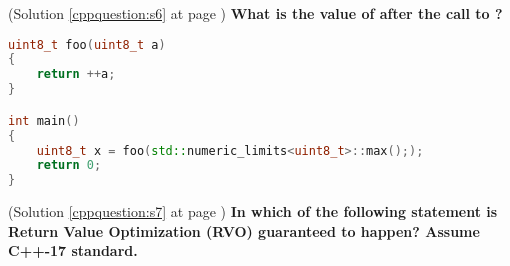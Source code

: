 \begin{cppquestion}
    \label{cppquestion:q6}
    (Solution \ref{cppquestion:s6} at page \pageref{cppquestion:s6})
    \question \textbf{What is the value of  after the call to ?} 
\begin{lstlisting}[language=c++,numbers=none, caption={}]
uint8_t foo(uint8_t a)
{
    return ++a;
}

int main()
{
    uint8_t x = foo(std::numeric_limits<uint8_t>::max(););
    return 0;
}
\end{lstlisting}
    \begin{choices}
     \choice {}
     \choice {}
     \choice {}
     \choice {}
     \choice {}
     \choice {}
     \choice {}
     \choice {}
     \choice {}
    \end{choices}
\end{cppquestion}



\begin{cppquestion}
    \label{cppquestion:q6}
    (Solution \ref{cppquestion:s7} at page \pageref{cppquestion:s7})
    \question \textbf{In which of the following statement is Return Value Optimization (RVO) guaranteed to happen? Assume C++-17 standard.} 
    \begin{choices}
     \choice {}
     \choice {}
     \choice {}
     \choice {}
    \end{choices}
\end{cppquestion}

















